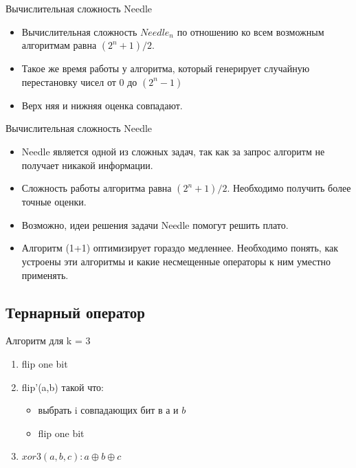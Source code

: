 \documentclass{beamer}
\begin{document}
 \begin{frame}{Вычислительная сложность Needle}
  \begin{itemize}
   \item Вычислительная сложность $Needle_n$ по отношению ко всем возможным алгоритмам равна $(2^n + 1) / 2$.
   \item Такое же время работы у алгоритма, который генерирует
случайную перестановку чисел от 0 до $(2^n - 1)$
   \item Верх няя и нижняя оценка совпадают.
  \end{itemize}
 \end{frame} 

  \begin{frame}{Вычислительная сложность Needle}
  \begin{itemize}
   \item Needle является одной из сложных задач, так как за запрос алгоритм не получает никакой информации.
   \item Сложность работы алгоритма равна $(2^n + 1) / 2$. Необходимо получить более точные оценки.
   \item Возможно, идеи решения задачи Needle помогут решить плато. 
   \item Алгоритм (1+1) оптимизирует гораздо медленнее. Необходимо понять, как устроены эти алгоритмы и какие несмещенные операторы к ним уместно применять.
   
  \end{itemize}
 \end{frame}


 \subsection{Тернарный оператор}
 \begin{frame}{Алгоритм для k = 3}
    \begin{enumerate}
        \item flip one bit
        \item flip'(a,b) такой что:
        \begin{itemize}
            \item выбрать i совпадающих бит в $а$ и $b$ 
            \item flip one bit
        \end{itemize}
        
        \item $ xor3(a,b,c):  a \oplus b \oplus c $
    \end{enumerate}
 \end{frame}
\end{document}
